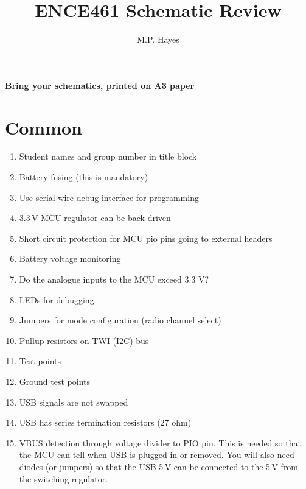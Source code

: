 \documentclass[a4paper, 12pt]{article}
\title{ENCE461 Schematic Review}
\author{M.P. Hayes}
\date{}
\begin{document}
\maketitle


\begin{center}
\textbf{Bring your schematics, printed on A3 paper}
\end{center}


\section{Common}

\begin{enumerate}
\item Student names and group number in title block

\item Battery fusing (this is mandatory)

\item Use serial wire debug interface for programming

\item 3.3\,V MCU regulator can be back driven

\item Short circuit protection for MCU pio pins going to external headers

\item Battery voltage monitoring

\item Do the analogue inputs to the MCU exceed 3.3 V?

\item LEDs for debugging

\item Jumpers for mode configuration (radio channel select)

\item Pullup resistors on TWI (I2C) bus

\item Test points

\item Ground test points

\item USB signals are not swapped
  
\item USB has series termination resistors (27 ohm)

\item VBUS detection through voltage divider to PIO pin.  This is
  needed so that the MCU can tell when USB is plugged in or removed.
  You will also need diodes (or jumpers) so that the USB 5\,V can be
  connected to the 5\,V from the switching regulator.


\end{enumerate}
\end{document}
